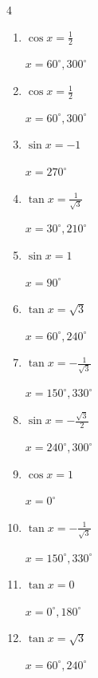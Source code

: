 \begin{multicols}{4}
\begin{enumerate}
  \item $\displaystyle \cos{x}  = \frac{1}{2}$

        $\displaystyle x = 60^{\circ} , 300^{\circ}$

  \item $\displaystyle \cos{x}  = \frac{1}{2}$

        $\displaystyle x = 60^{\circ} , 300^{\circ}$

  \item $\displaystyle \sin{x}  = -1$

        $\displaystyle x = 270^{\circ}$

  \item $\displaystyle \tan{x}  = \frac{1}{\sqrt{3}}$

        $\displaystyle x = 30^{\circ} , 210^{\circ}$

  \item $\displaystyle \sin{x}  = 1$

        $\displaystyle x = 90^{\circ}$

  \item $\displaystyle \tan{x}  = \sqrt{3}$

        $\displaystyle x = 60^{\circ} , 240^{\circ}$

  \item $\displaystyle \tan{x}  = -\frac{1}{\sqrt{3}}$

        $\displaystyle x = 150^{\circ} , 330^{\circ}$

  \item $\displaystyle \sin{x}  = -\frac{\sqrt{3}}{2}$

        $\displaystyle x = 240^{\circ} , 300^{\circ}$

  \item $\displaystyle \cos{x}  = 1$

        $\displaystyle x = 0^{\circ}$

  \item $\displaystyle \tan{x}  = -\frac{1}{\sqrt{3}}$

        $\displaystyle x = 150^{\circ} , 330^{\circ}$

  \item $\displaystyle \tan{x}  = 0$

        $\displaystyle x = 0^{\circ} , 180^{\circ}$

  \item $\displaystyle \tan{x}  = \sqrt{3}$

        $\displaystyle x = 60^{\circ} , 240^{\circ}$


\end{enumerate}
\end{multicols}
